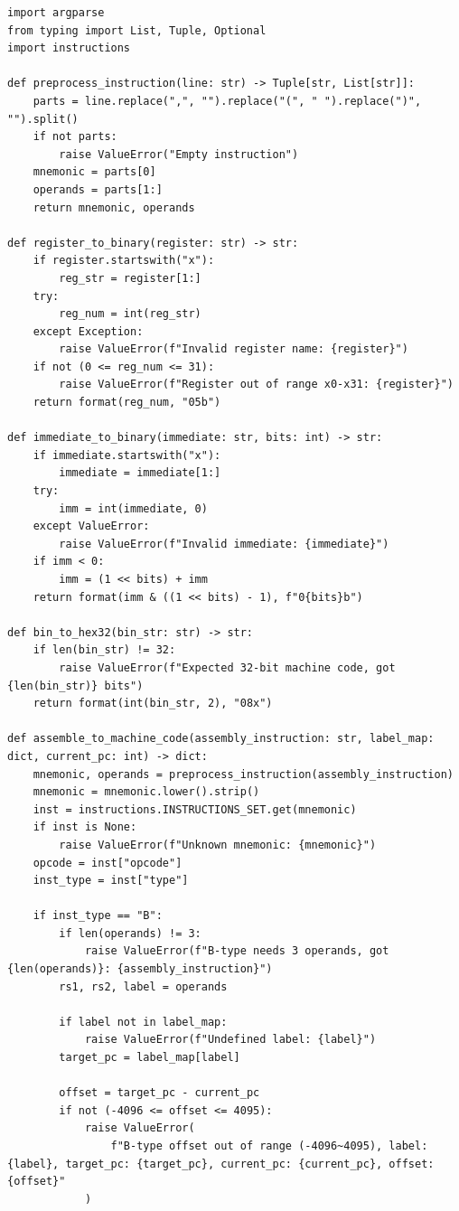 \documentclass[11pt]{article}
\begin{document}
\begin{lstlisting}[style=mypython, caption=The Assembler Code, label=lst:assembler]
import argparse
from typing import List, Tuple, Optional
import instructions

def preprocess_instruction(line: str) -> Tuple[str, List[str]]:
    parts = line.replace(",", "").replace("(", " ").replace(")", "").split()
    if not parts:
        raise ValueError("Empty instruction")
    mnemonic = parts[0]
    operands = parts[1:]
    return mnemonic, operands

def register_to_binary(register: str) -> str:
    if register.startswith("x"):
        reg_str = register[1:]
    try:
        reg_num = int(reg_str)
    except Exception:
        raise ValueError(f"Invalid register name: {register}")
    if not (0 <= reg_num <= 31):
        raise ValueError(f"Register out of range x0-x31: {register}")
    return format(reg_num, "05b")

def immediate_to_binary(immediate: str, bits: int) -> str:
    if immediate.startswith("x"):
        immediate = immediate[1:]
    try:
        imm = int(immediate, 0)  
    except ValueError:
        raise ValueError(f"Invalid immediate: {immediate}")
    if imm < 0:
        imm = (1 << bits) + imm  
    return format(imm & ((1 << bits) - 1), f"0{bits}b")  

def bin_to_hex32(bin_str: str) -> str:
    if len(bin_str) != 32:
        raise ValueError(f"Expected 32-bit machine code, got {len(bin_str)} bits")
    return format(int(bin_str, 2), "08x")

def assemble_to_machine_code(assembly_instruction: str, label_map: dict, current_pc: int) -> dict:
    mnemonic, operands = preprocess_instruction(assembly_instruction)
    mnemonic = mnemonic.lower().strip()
    inst = instructions.INSTRUCTIONS_SET.get(mnemonic)
    if inst is None:
        raise ValueError(f"Unknown mnemonic: {mnemonic}")
    opcode = inst["opcode"]
    inst_type = inst["type"]

    if inst_type == "B":
        if len(operands) != 3:
            raise ValueError(f"B-type needs 3 operands, got {len(operands)}: {assembly_instruction}")
        rs1, rs2, label = operands

        if label not in label_map:
            raise ValueError(f"Undefined label: {label}")
        target_pc = label_map[label]

        offset = target_pc - current_pc
        if not (-4096 <= offset <= 4095):
            raise ValueError(
                f"B-type offset out of range (-4096~4095), label: {label}, target_pc: {target_pc}, current_pc: {current_pc}, offset: {offset}"
            )


\end{lstlisting}
\end{document}
